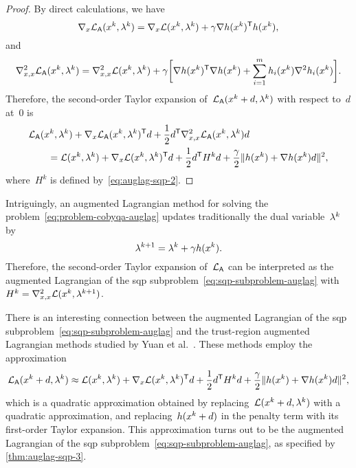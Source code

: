 \begin{proof}
    By direct calculations, we have
    \begin{equation*}
        \nabla_x \auglag(\iter[k], \lm[k]) = \nabla_x \lag(\iter[k], \lm[k]) + \gamma \nabla h(\iter[k])^{\T} h(\iter[k]),
    \end{equation*}
    and
    \begin{equation*}
        \nabla_{x, x}^2 \auglag(\iter[k], \lm[k]) = \nabla_{x, x}^2 \lag(\iter[k], \lm[k]) + \gamma \bigg[ \nabla h(\iter[k])^{\T} \nabla h(\iter[k]) + \sum_{i = 1}^m h_i(\iter[k]) \nabla^2 h_i(\iter[k]) \bigg].
    \end{equation*}
    Therefore, the second-order Taylor expansion of~$\auglag(\iter[k] + d, \lm[k])$ with respect to~$d$ at~$0$ is
    \begin{align*}
        & \auglag(\iter[k], \lm[k]) + \nabla_x \auglag(\iter[k], \lm[k])^{\T} d + \frac{1}{2} d^{\T} \nabla_{x, x}^2 \auglag(\iter[k], \lm[k]) d\\
        & \qquad = \lag(\iter[k], \lm[k]) + \nabla_x \lag(\iter[k], \lm[k])^{\T} d + \frac{1}{2} d^{\T} H^k d + \frac{\gamma}{2} \norm{h(\iter[k]) + \nabla h(\iter[k]) d}^2,
    \end{align*}
    where~$H^k$ is defined by~\cref{eq:auglag-sqp-2}.
\end{proof}

Intriguingly, an augmented Lagrangian method for solving the problem~\cref{eq:problem-cobyqa-auglag} updates traditionally the dual variable~$\lm[k]$ by
\begin{equation*}
    \lm[k + 1] = \lm[k] + \gamma h(\iter[k]).
\end{equation*}
Therefore, the second-order Taylor expansion of~$\mathcal{L}_{\mathsf{A}}$ can be interpreted as the augmented Lagrangian of the \gls{sqp} subproblem~\cref{eq:sqp-subproblem-auglag} with~$H^k = \nabla_{x, x}^2 \lag(\iter[k], \lm[k + 1])$.

There is an interesting connection between the augmented Lagrangian of the \gls{sqp} subproblem~\cref{eq:sqp-subproblem-auglag} and the trust-region augmented Lagrangian methods studied by Yuan et al.~\cite{Niu_Yuan_2010,Wang_Yuan_2014}.
These methods employ the approximation
\begin{equation}
    \label{eq:niu-yuan-auglag}
    \auglag(\iter[k] + \step, \lm[k]) \approx \lag(\iter[k], \lm[k]) + \nabla_x \lag(\iter[k], \lm[k])^{\T} d + \frac{1}{2} d^{\T} H^k d + \frac{\gamma}{2} \norm{h(\iter[k]) + \nabla h(\iter[k]) \step}^2,
\end{equation}
which is a quadratic approximation obtained by replacing~$\lag(\iter[k] + d, \lm[k])$ with a quadratic approximation, and replacing~$h(\iter[k] + d)$ in the penalty term with its first-order Taylor expansion.
This approximation turns out to be the augmented Lagrangian of the \gls{sqp} subproblem~\cref{eq:sqp-subproblem-auglag}, as specified by \cref{thm:auglag-sqp-3}.

